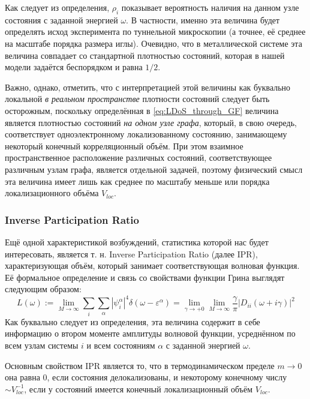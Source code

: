Как следует из определения, $\rho_i$ показывает вероятность наличия на данном узле состояния с заданной энергией $\omega$. В частности, именно эта величина будет определять исход эксперимента по туннельной микроскопии (а точнее, её среднее на масштабе порядка размера иглы). Очевидно, что в металлической системе эта величина совпадает со стандартной плотностью состояний, которая в нашей модели задаётся беспорядком и равна $1/2$. 

Важно, однако, отметить, что с интерпретацией этой величины как буквально локальной \textit{в реальном пространстве} плотности состояний следует быть осторожным, поскольку определённая в \eqref{eq:LDoS_through_GF} величина является плотностью состояний \textit{на одном узле графа}, который, в свою очередь, соответствует одноэлектронному локализованному состоянию, занимающему некоторый конечный корреляционный объём. При этом взаимное пространственное расположение различных состояний, соответствующее различным узлам графа, является отдельной задачей, поэтому физический смысл эта величина имеет лишь как среднее по масштабу меньше или порядка локализационного объёма $V_{loc}$.

\subsubsection{Inverse Participation Ratio}
Ещё одной характеристикой возбуждений, статистика которой нас будет интересовать, является т. н. Inverse Participation Ratio (далее IPR), характеризующая объём, который занимает соответствующая волновая функция. Её формальное определение и связь со свойствами функции Грина выглядят следующим образом:
\begin{equation}
	\label{eq:IPR_through_GF}
	L(\omega) := \lim_{M \rightarrow \infty} \sum_i \sum_\alpha \left| \psi^\alpha_i \right|^4 \delta(\omega - \varepsilon^\alpha) = \lim_{\gamma \rightarrow +0} \lim_{M \rightarrow \infty} \frac{\gamma}{\pi} \left| D_{ii}(\omega + i \gamma) \right|^2 
\end{equation}
Как буквально следует из определения, эта величина содержит в себе информацию о втором моменте амплитуды волновой функции, усреднённом по всем узлам системы $i$ и всем состояниям $\alpha$  с заданной энергией $\omega$.

Основным свойством IPR является то, что в термодинамическом пределе $m \rightarrow 0$ она равна 0, если состояния делокализованы, и некоторому конечному числу $\sim V_{loc}^{-1} $, если у состояний имеется конечный локализационный объём $V_{loc}$. 


